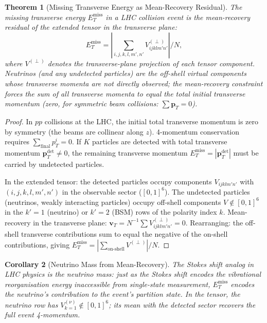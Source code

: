 \documentclass[twocolumn,10pt,a4paper]{article}
\theoremstyle{thmstyle}
\newtheorem{theorem}{Theorem}[section]
\newtheorem{corollary}[theorem]{Corollary}
\theoremstyle{definition}
\theoremstyle{remark}
\newcommand{\ETmiss}{E_{T}^{\mathrm{miss}}}
\begin{document}
\begin{theorem}[Missing Transverse Energy as Mean-Recovery Residual]
\label{thm:etmiss}
The missing transverse energy $\ETmiss$ in a LHC collision event is the
mean-recovery residual of the extended tensor in the transverse plane:
\begin{equation}
\ETmiss = \left|\sum_{i,j,k,l,m',n'}
V_{ijklm'n'}^{(\perp)} \right| / N,
\label{eq:etmiss}
\end{equation}
where $V^{(\perp)}$ denotes the transverse-plane projection of each
tensor component.  Neutrinos (and any undetected particles) are the
off-shell virtual components whose transverse momenta are not directly
observed; the mean-recovery constraint forces the sum of all transverse
momenta to equal the total initial transverse momentum (zero, for symmetric
beam collisions: $\sum \mathbf{p}_T = 0$).
\end{theorem}

\begin{proof}
In $pp$ collisions at the LHC, the initial total transverse momentum is
zero by symmetry (the beams are collinear along $z$).
4-momentum conservation requires $\sum_\text{final} p_T^i = 0$.
If $K$ particles are detected with total transverse momentum
$\mathbf{p}_T^\text{det} \neq 0$, the remaining transverse momentum
$\ETmiss = |\mathbf{p}_T^\text{det}|$ must be carried by undetected particles.

In the extended tensor: the detected particles occupy components
$V_{ijklm'n'}$ with $(i,j,k,l,m',n')$ in the observable sector
($[0,1]^6$).  The undetected particles (neutrinos, weakly interacting
particles) occupy off-shell components $V \notin [0,1]^6$ in the $k'=1$
(neutrino) or $k'=2$ (BSM) rows of the polarity index $k$.
Mean-recovery in the transverse plane:
$\mathbf{v}_T = N^{-1}\sum V_{ijklm'n'}^{(\perp)} = 0$.
Rearranging: the off-shell transverse contributions sum to equal the
negative of the on-shell contributions, giving
$\ETmiss = |\sum_\text{on-shell} V^{(\perp)}| / N$.
\end{proof}

\begin{corollary}[Neutrino Mass from Mean-Recovery]
\label{cor:neutrino_mass}
The Stokes shift analog in LHC physics is the neutrino mass:
just as the Stokes shift encodes the vibrational reorganisation energy
inaccessible from single-state measurement, $\ETmiss$ encodes the
neutrino's contribution to the event's partition state.  In the tensor,
the neutrino row has $V^{(\nu)}_{k=1} \notin [0,1]^6$; its mean with the
detected sector recovers the full event 4-momentum.
\end{corollary}
\end{document}
